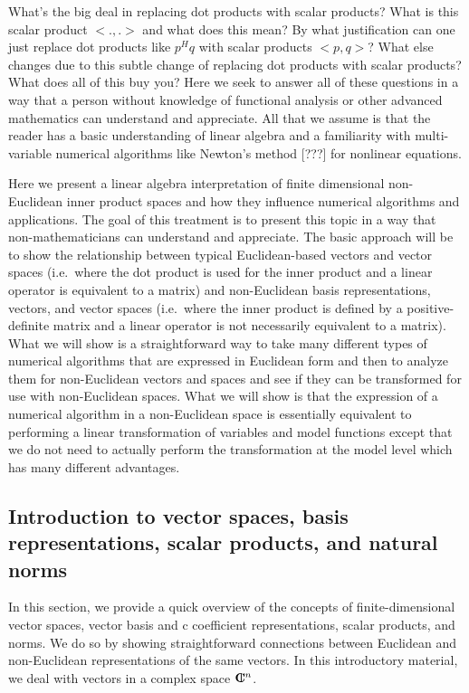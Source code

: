 What's the big deal in replacing dot products with scalar products?  What is
this scalar product $<.,.>$ and what does this mean? By what justification can
one just replace dot products like $p^H q$ with scalar products $<p,q>$?  What
else changes due to this subtle change of replacing dot products with scalar
products?  What does all of this buy you?  Here we seek to answer all of these
questions in a way that a person without knowledge of functional analysis or
other advanced mathematics can understand and appreciate.  All that we assume
is that the reader has a basic understanding of linear algebra and a
familiarity with multi-variable numerical algorithms like Newton's method
[???] for nonlinear equations.

Here we present a linear algebra interpretation of finite dimensional
non-Euclidean inner product spaces and how they influence numerical algorithms
and applications.  The goal of this treatment is to present this topic in a
way that non-mathematicians can understand and appreciate.  The basic approach
will be to show the relationship between typical Euclidean-based vectors and
vector spaces (i.e.\ where the dot product is used for the inner product and a
linear operator is equivalent to a matrix) and non-Euclidean basis
representations, vectors, and vector spaces (i.e.\ where the inner product is
defined by a positive-definite matrix and a linear operator is not necessarily
equivalent to a matrix).  What we will show is a straightforward way to take
many different types of numerical algorithms that are expressed in Euclidean
form and then to analyze them for non-Euclidean vectors and spaces and see if
they can be transformed for use with non-Euclidean spaces.  What we will show
is that the expression of a numerical algorithm in a non-Euclidean space is
essentially equivalent to performing a linear transformation of variables and
model functions except that we do not need to actually perform the
transformation at the model level which has many different advantages.

\subsection{Introduction to vector spaces, basis representations, scalar products, and natural norms}

In this section, we provide a quick overview of the concepts of
finite-dimensional vector spaces, vector basis and c coefficient
representations, scalar products, and norms.  We do so by showing
straightforward connections between Euclidean and non-Euclidean representations
of the same vectors.  In this introductory material, we deal with vectors in a
complex space $\mbox{\textbf{C}}\hspace{-1.1ex}\mbox{l}\hspace{0.4ex}^n$.

